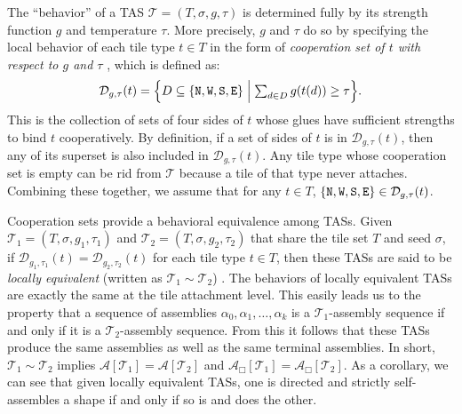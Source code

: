 \documentclass{article}
\theoremstyle{remark}
\theoremstyle{definition}
\newcommand{\tas}{\ensuremath{\mathcal{T}}}
\newcommand{\north}{{\tt N}}
\newcommand{\west}{{\tt W}}
\newcommand{\south}{{\tt S}}
\newcommand{\east}{{\tt E}}
\begin{document}
The ``behavior'' of a TAS $\tas = (T, \sigma, g, \tau)$ is determined fully by its strength function $g$ and temperature $\tau$. 
More precisely, $g$ and $\tau$ do so by specifying the local behavior of each tile type $t \in T$ in the form of {\it cooperation set of $t$ with respect to $g$ and $\tau$} \cite{ChenDotySeki2011}, which is defined as:  
\[
	\mathcal{D}_{g, \tau}(t) = \Bigl\{ D \subseteq \{\north, \west, \south, \east\} \Bigm| \mbox{$\sum_{d \in D} g(t(d)) \ge \tau$} \Bigr\}. 
\]
This is the collection of sets of four sides of $t$ whose glues have sufficient strengths to bind $t$ cooperatively. 
By definition, if a set of sides of $t$ is in $\mathcal{D}_{g, \tau}(t)$, then any of its superset is also included in $\mathcal{D}_{g, \tau}(t)$. 
Any tile type whose cooperation set is empty can be rid from $\tas$ because a tile of that type never attaches. 
Combining these together, we assume that for any $t \in T$, $\{\north, \west, \south, \east\} \in \mathcal{D}_{g, \tau}(t)$. 

Cooperation sets provide a behavioral equivalence among TASs. 
Given $\tas_1 = (T, \sigma, g_1, \tau_1)$ and $\tas_2 = (T, \sigma, g_2, \tau_2)$ that share the tile set $T$ and seed $\sigma$, if $\mathcal{D}_{g_1, \tau_1}(t) = \mathcal{D}_{g_2, \tau_2}(t)$ for each tile type $t \in T$, then these TASs are said to be {\it locally equivalent} (written as $\tas_1 \sim \tas_2$) \cite{ChenDotySeki2011}. 
The behaviors of locally equivalent TASs are exactly the same at the tile attachment level.
This easily leads us to the property that a sequence of assemblies $\alpha_0, \alpha_1, \ldots, \alpha_k$ is a $\tas_1$-assembly sequence if and only if it is a $\tas_2$-assembly sequence. 
From this it follows that these TASs produce the same assemblies as well as the same terminal assemblies. 
In short, $\tas_1 \sim \tas_2$ implies $\mathcal{A}[\tas_1] = \mathcal{A}[\tas_2]$ and $\mathcal{A}_\Box[\tas_1] = \mathcal{A}_\Box[\tas_2]$. 
As a corollary, we can see that given locally equivalent TASs, one is directed and strictly self-assembles a shape if and only if so is and does the other. 
\end{document}
